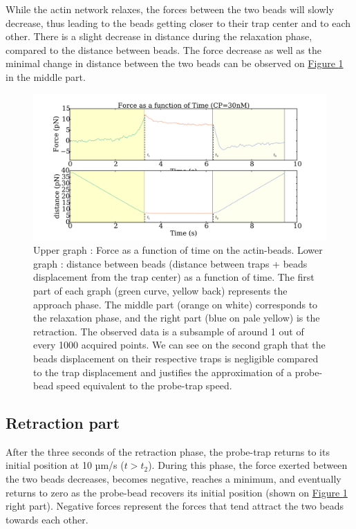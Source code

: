 \documentclass[A4paperpaper,11pt,english]{sphinxmanual}
\begin{document}
While the actin network relaxes, the forces between the two beads will slowly
decrease, thus leading to the beads getting closer to their trap center and
to each other. There is a slight decrease in distance during the relaxation phase, compared to the distance between beads. The force decrease as well as
the minimal change in distance between the two beads can be observed on \hyperref[index-latex:figindent-time]{Figure  \ref*{index-latex:figindent-time}}
in the middle part.
\begin{figure}[htbp]
\centering
\capstart

\includegraphics[width=0.700\linewidth]{force_time.pdf}
\caption{Upper graph : Force as a function of time on the actin-beads.  Lower graph
: distance between beads (distance between traps + beads
displacement from the trap center) as a function of time. The first part of each graph
(green curve, yellow back) represents the approach phase. The middle part
(orange on white) corresponds to the relaxation phase, and the right part (blue on pale
yellow) is the retraction. The observed data is a subsample of around 1 out of every
1000 acquired points. We can see on the second graph that the beads
displacement on their respective traps is negligible compared to the
trap displacement and justifies the approximation of a probe-bead
speed equivalent to the probe-trap speed.}\label{index-latex:figindent-time}\end{figure}


\subsection{Retraction part}
\label{index-latex:retraction-part}
After the three seconds of the retraction phase, the probe-trap returns to
its  initial position at 10 µm/s (\(t > t_2\)). During this phase, the force
exerted between the two beads decreases, becomes negative, reaches a minimum, and
eventually returns to zero as the probe-bead recovers its initial
position (shown on \hyperref[index-latex:figindent-time]{Figure  \ref*{index-latex:figindent-time}} right part). Negative forces
represent the forces that tend attract the two beads towards each other.
\end{document}
